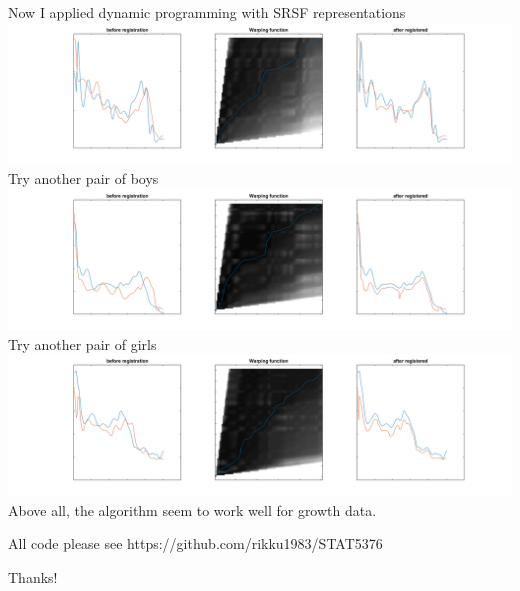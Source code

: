 \documentclass[11pt]{scrartcl}
\begin{document}
Now I applied dynamic programming with SRSF representations\\
\includegraphics[scale=0.4]{hw510.png}\\
Try another pair of boys\\
\includegraphics[scale=0.4]{hw511.png}\\
Try another pair of girls\\
\includegraphics[scale=0.4]{hw512.png}\\
Above all, the algorithm seem to work well for growth data.

All code please see https://github.com/rikku1983/STAT5376\\
\bigskip

Thanks!
\end{document}
